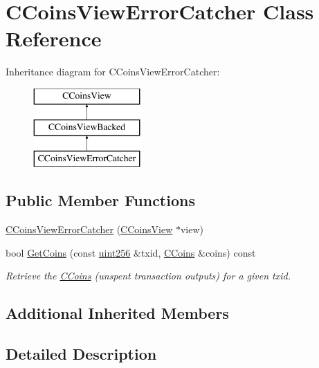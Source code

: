 \hypertarget{class_c_coins_view_error_catcher}{}\section{C\+Coins\+View\+Error\+Catcher Class Reference}
\label{class_c_coins_view_error_catcher}
Inheritance diagram for C\+Coins\+View\+Error\+Catcher\+:\begin{figure}[H]
\begin{center}
\leavevmode
\includegraphics[height=3.000000cm]{class_c_coins_view_error_catcher}
\end{center}
\end{figure}
\subsection*{Public Member Functions}
\begin{DoxyCompactItemize}
\item 
\hyperlink{class_c_coins_view_error_catcher_aa8295e2f5ce5ad9880c5bd86d52e014c}{C\+Coins\+View\+Error\+Catcher} (\hyperlink{class_c_coins_view}{C\+Coins\+View} $\ast$view)
\item 
bool \hyperlink{class_c_coins_view_error_catcher_a762969de31b62e55d01f1cdf0b178eb9}{Get\+Coins} (const \hyperlink{classuint256}{uint256} \&txid, \hyperlink{class_c_coins}{C\+Coins} \&coins) const 
\begin{DoxyCompactList}\small\item\em Retrieve the \hyperlink{class_c_coins}{C\+Coins} (unspent transaction outputs) for a given txid. \end{DoxyCompactList}\end{DoxyCompactItemize}
\subsection*{Additional Inherited Members}


\subsection{Detailed Description}


